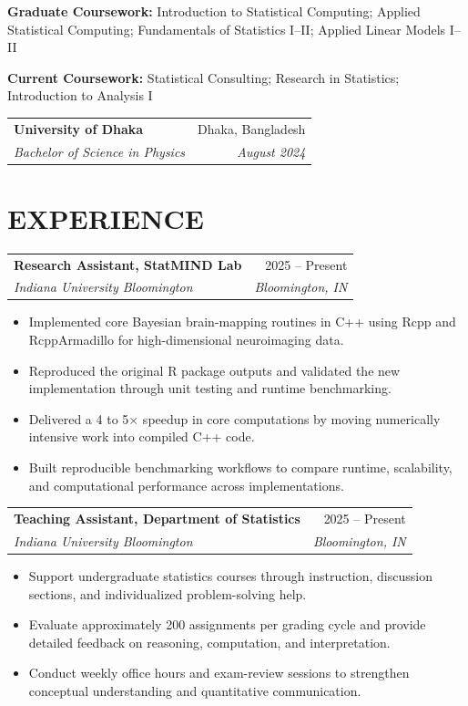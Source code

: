 \documentclass[10pt,letterpaper]{article}
\makeatletter
\newcommand{\resumeEntry}[4]{%
	\begin{tabularx}{\textwidth}{@{}Xr@{}}
		\textbf{#1} & #2 \\
		\textit{#3} & \textit{#4}
	\end{tabularx}%
}
\newenvironment{resumeItems}{%
	\begin{itemize}[
		label=\textbullet,
		leftmargin=14pt,
		labelsep=5pt,
		itemsep=0.5pt,
		topsep=1.0pt,
		parsep=0pt,
		partopsep=0pt
	]
}{%
	\end{itemize}
}
\makeatother
\begin{document}
\vspace{0.5pt}

\textbf{Graduate Coursework:}
Introduction to Statistical Computing; Applied Statistical Computing;
Fundamentals of Statistics I--II; Applied Linear Models I--II

\vspace{0.3pt}

\textbf{Current Coursework:}
Statistical Consulting; Research in Statistics;
Introduction to Analysis I

\vspace{2.2pt}

\resumeEntry
	{University of Dhaka}
	{Dhaka, Bangladesh}
	{Bachelor of Science in Physics}
	{August 2024}

\section*{EXPERIENCE}

\resumeEntry
	{Research Assistant, StatMIND Lab}
	{2025 -- Present}
	{Indiana University Bloomington}
	{Bloomington, IN}

\begin{resumeItems}
	\item Implemented core Bayesian brain-mapping routines in C++ using Rcpp and RcppArmadillo for high-dimensional neuroimaging data.

	\item Reproduced the original R package outputs and validated the new implementation through unit testing and runtime benchmarking.

	\item Delivered a 4 to 5$\times$ speedup in core computations by moving numerically intensive work into compiled C++ code.

	\item Built reproducible benchmarking workflows to compare runtime, scalability, and computational performance across implementations.
\end{resumeItems}

\vspace{1.3pt}

\resumeEntry
	{Teaching Assistant, Department of Statistics}
	{2025 -- Present}
	{Indiana University Bloomington}
	{Bloomington, IN}

\begin{resumeItems}
	\item Support undergraduate statistics courses through instruction, discussion sections, and individualized problem-solving help.

	\item Evaluate approximately 200 assignments per grading cycle and provide detailed feedback on reasoning, computation, and interpretation.

	\item Conduct weekly office hours and exam-review sessions to strengthen conceptual understanding and quantitative communication.
\end{resumeItems}
\end{document}
